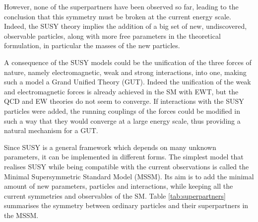 However, none of the superpartners have been observed so far, leading to the conclusion that this symmetry must be broken at the current energy scale. Indeed, the SUSY theory implies the addition of a big set of new, undiscovered, observable particles, along with more free parameters in the theoretical formulation, in particular the masses of the new particles.\newline

A consequence of the SUSY models could be the unification of the three forces of nature, namely electromagnetic, weak and strong interactions, into one, making such a model a Grand Unified Theory (GUT). Indeed the unification of the weak and electromagnetic forces is already achieved in the SM with EWT, but the QCD and EW theories do not seem to converge. If interactions with the SUSY particles were added, the running couplings of the forces could be modified in such a way that they would converge at a large energy scale, thus providing a natural mechanism for a GUT.\newline

Since SUSY is a general framework which depends on many unknown parameters, it can be implemented in different forms. The simplest model that realises SUSY while being compatible with the current observations is called the Minimal Supersymmetric Standard Model (MSSM). Its aim is to add the minimal amount of new parameters, particles and interactions, while keeping all the current symmetries and observables of the SM. Table \ref{tab:superpartners} summarises the symmetry between ordinary particles and their superpartners in the MSSM.\newline

